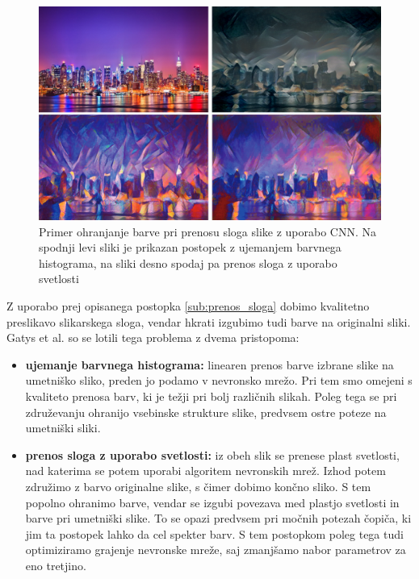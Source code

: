 \documentclass[runningheads,a4paper]{llncs}
\begin{document}
\begin{figure}
\centering
\includegraphics[width=120mm]{figures/prenos_barve.png}
\caption{Primer ohranjanje barve pri prenosu sloga slike z uporabo CNN. Na spodnji levi sliki je prikazan postopek z ujemanjem barvnega histograma, na sliki desno spodaj pa prenos sloga z uporabo svetlosti}
\label{fig:prenos_barve}
\end{figure}

Z uporabo prej opisanega postopka \ref{sub:prenos_sloga} dobimo kvalitetno preslikavo slikarskega sloga, vendar hkrati izgubimo tudi barve na originalni sliki. Gatys et al. \cite{prenos_barve} so se lotili tega problema z dvema pristopoma: 

\begin{itemize}
\item \textbf{ujemanje barvnega histograma:} linearen prenos barve izbrane slike na umetniško sliko, preden jo podamo v nevronsko mrežo. Pri tem smo omejeni s kvaliteto prenosa barv, ki je težji pri bolj različnih slikah. Poleg tega se pri združevanju ohranijo vsebinske strukture slike, predvsem ostre poteze na umetniški sliki.

\item \textbf{prenos sloga z uporabo svetlosti:} iz obeh slik se prenese plast svetlosti, nad katerima se potem uporabi algoritem nevronskih mrež. Izhod potem združimo z barvo originalne slike, s čimer dobimo končno sliko. S tem popolno ohranimo barve, vendar se izgubi povezava med plastjo svetlosti in barve pri umetniški slike. To se opazi predvsem pri močnih potezah čopiča, ki jim ta postopek lahko da cel spekter barv. S tem postopkom poleg tega tudi optimiziramo grajenje nevronske mreže, saj zmanjšamo nabor parametrov za eno tretjino.
\end{itemize}
\end{document}
